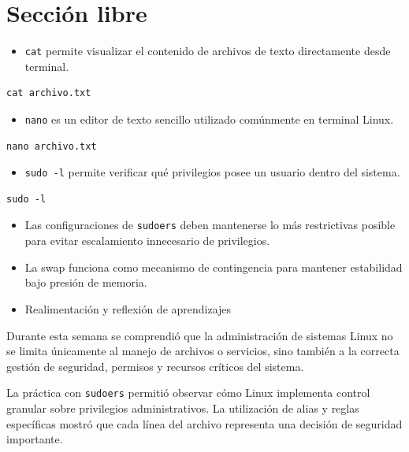 \documentclass[11pt, letterpaper]{article}
\begin{document}
\section{Sección libre}
\label{sec:org942aae4}

\begin{itemize}
\item \texttt{cat} permite visualizar el contenido de archivos de texto directamente desde terminal.
\end{itemize}

\begin{verbatim}
cat archivo.txt
\end{verbatim}

\begin{itemize}
\item \texttt{nano} es un editor de texto sencillo utilizado comúnmente en terminal Linux.
\end{itemize}

\begin{verbatim}
nano archivo.txt
\end{verbatim}

\begin{itemize}
\item \texttt{sudo -l} permite verificar qué privilegios posee un usuario dentro del sistema.
\end{itemize}

\begin{verbatim}
sudo -l
\end{verbatim}

\begin{itemize}
\item Las configuraciones de \texttt{sudoers} deben mantenerse lo más restrictivas posible para evitar escalamiento innecesario de privilegios.
\item La swap funciona como mecanismo de contingencia para mantener estabilidad bajo presión de memoria.

\item Realimentación y reflexión de aprendizajes
\end{itemize}

Durante esta semana se comprendió que la administración de sistemas Linux no se limita únicamente al manejo de archivos o servicios, sino también a la correcta gestión de seguridad, permisos y recursos críticos del sistema.

La práctica con \texttt{sudoers} permitió observar cómo Linux implementa control granular sobre privilegios administrativos. La utilización de alias y reglas específicas mostró que cada línea del archivo representa una decisión de seguridad importante.
\end{document}
